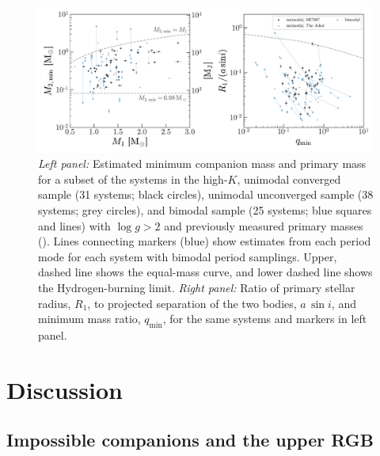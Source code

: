 \documentclass[modern, letterpaper]{aastex62}
\newcommand{\logg}{\ensuremath{\log g}}
\begin{document}
\begin{figure}[h]
\begin{center}
\includegraphics[width=\textwidth]{mass}
\end{center}
\caption{%
\textit{Left panel:} Estimated minimum companion mass and primary mass for a
subset of the systems in the high-$K$, unimodal converged sample (31 systems;
black circles), unimodal unconverged sample (38 systems; grey circles), and
bimodal sample (25 systems; blue squares and lines) with $\logg > 2$ and
previously measured primary masses (\citealt{Ness:2015}).
Lines connecting markers (blue) show estimates from each period mode for each
system with bimodal period samplings.
Upper, dashed line shows the equal-mass curve, and lower dashed line shows the
Hydrogen-burning limit.
\textit{Right panel:} Ratio of primary stellar radius, $R_1$, to projected
separation of the two bodies, $a\,\sin i$, and minimum mass ratio,
$q_{\textrm{min}}$, for the same systems and markers in left panel.
\label{fig:mass}
}
\end{figure}


\section{Discussion}

\subsection{Impossible companions and the upper RGB}
\end{document}
